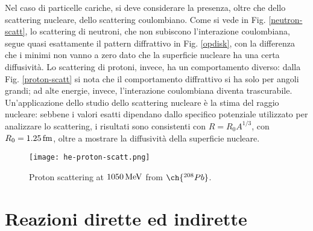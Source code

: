 Nel caso di particelle cariche, si deve considerare la presenza, oltre che dello scattering nucleare, dello scattering coulombiano. Come si vede in Fig. \ref{neutron-scatt}, lo scattering di neutroni, che non subiscono l'interazione coulombiana, segue quasi esattamente il pattern diffrattivo in Fig. \ref{opdisk}, con la differenza che i minimi non vanno a zero dato che la superficie nucleare ha una certa diffusività. Lo scattering di protoni, invece, ha un comportamento diverso: dalla Fig. \ref{proton-scatt} si nota che il comportamento diffrattivo si ha solo per angoli grandi; ad alte energie, invece, l'interazione coulombiana diventa trascurabile.\\
Un'applicazione dello studio dello scattering nucleare è la stima del raggio nucleare: sebbene i valori esatti dipendano dallo specifico potenziale utilizzato per analizzare lo scattering, i risultati sono consistenti con $ R = R_0 A^{1/3} $, con $ R_0 = 1.25\,\mathrm{fm} $, oltre a mostrare la diffusività della superficie nucleare.

\begin{figure}[!b]
	\centering
	\texttt{[image: he-proton-scatt.png]}
	\caption{Proton scattering at $ 1050\,\mathrm{MeV} $ from $ \ch{^{208}Pb} $.}
	\label{he-proton-scatt}
\end{figure}

\section{Reazioni dirette ed indirette}

